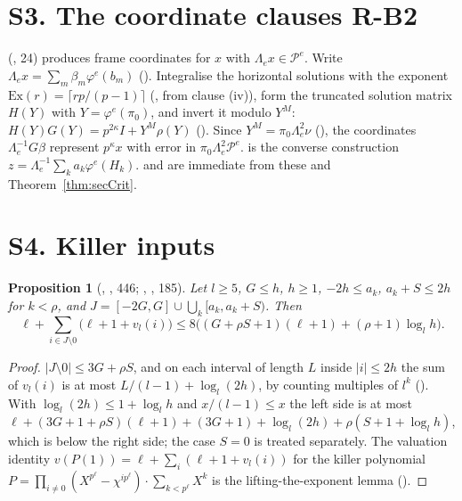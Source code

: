 \documentclass[11pt]{article}
\newcommand{\Pp}{\mathcal P}
\newtheorem{prop}[lemma]{Proposition}
\theoremstyle{definition}
\theoremstyle{remark}
\begin{document}
\section{S3. The coordinate clauses R-B2}\label{sec:rb2}

 (, 24) produces frame coordinates for $x$ with $\Lambda_ex\in\Pp^e$. Write $\Lambda_ex=\sum_m\beta_m\varphi^e(b_m)$ (). Integralise the horizontal solutions with the exponent $\mathrm{Ex}(r)=\lceil rp/(p-1)\rceil$ (, from  clause (iv)), form the truncated solution matrix $H(Y)$ with $Y=\varphi^e(\pi_0)$, and invert it modulo $Y^M$: $H(Y)G(Y)=p^{2\kappa}I+Y^M\rho(Y)$ (). Since $Y^M=\pi_0\Lambda_e^2\nu$ (), the coordinates $\Lambda_e^{-1}G\beta$ represent $p^{\kappa}x$ with error in $\pi_0\Lambda_e^2\Pp^e$.  is the converse construction $z=\Lambda_e^{-1}\sum_ka_k\varphi^e(H_k)$.  and  are immediate from these and Theorem~\ref{thm:secCrit}.

\section{S4. Killer inputs}\label{sec:killer}

\begin{prop}[, , 446; , , 185]
Let $l\ge5$, $G\le h$, $h\ge1$, $-2h\le a_k$, $a_k+S\le2h$ for $k<\rho$, and $J=[-2G,G]\cup\bigcup_k[a_k,a_k+S)$. Then
\[
\ell+\sum_{i\in J\setminus0}\bigl(\ell+1+v_l(i)\bigr)\le8\bigl((G+\rho S+1)(\ell+1)+(\rho+1)\log_lh\bigr).
\]
\end{prop}
\begin{proof}
$|J\setminus0|\le3G+\rho S$, and on each interval of length $L$ inside $|i|\le2h$ the sum of $v_l(i)$ is at most $L/(l-1)+\log_l(2h)$, by counting multiples of $l^k$ (). With $\log_l(2h)\le1+\log_lh$ and $x/(l-1)\le x$ the left side is at most $\ell+(3G+1+\rho S)(\ell+1)+(3G+1)+\log_l(2h)+\rho(S+1+\log_lh)$, which is below the right side; the case $S=0$ is treated separately. The valuation identity $v(P(1))=\ell+\sum_{i}(\ell+1+v_l(i))$ for the killer polynomial $P=\prod_{i\ne0}(X^{p^\ell}-\chi^{ip^\ell})\cdot\sum_{k<p^\ell}X^k$ is the lifting-the-exponent lemma ().
\end{proof}
\end{document}
